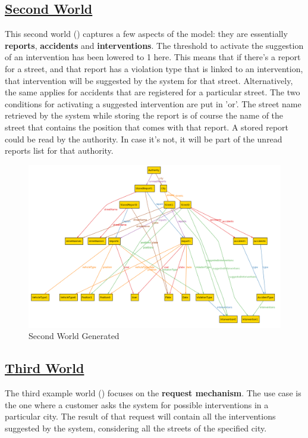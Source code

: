 	\subsection[Second World]{\hyperlink{toc}{Second World}}
	This second world () captures a few aspects of the model: they are essentially \textbf{reports}, \textbf{accidents} and \textbf{interventions}. The threshold to activate the suggestion of an intervention has been lowered to 1 here. This means that if there's a report for a street, and that report has a violation type that is linked to an intervention, that intervention will be suggested by the system for that street. Alternatively, the same applies for accidents that are registered for a particular street. The two conditions for activating a suggested intervention are put in 'or'.
	The street name retrieved by the system while storing the report is of course the name of the street that contains the position that comes with that report.
	A stored report could be read by the authority. In case it's not, it will be part of the unread reports list for that authority.
	
	\begin{figure}[hbtp]
		\centering
		\includegraphics[scale=0.4, angle=90]{Files/alloy/world2.png}
		\caption{\label{fig:secondWorld}Second World Generated}
	\end{figure}
	
	\FloatBarrier
	\subsection[Third World]{\hyperlink{toc}{Third World}}
	The third example world () focuses on the \textbf{request mechanism}. The use case is the one where a customer asks the system for possible interventions in a particular city. The result of that request will contain all the interventions suggested by the system, considering all the streets of the specified city.
	
